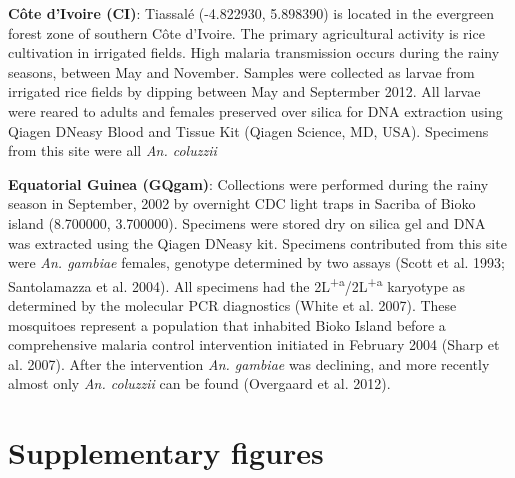 \documentclass[a4paper,11pt,abstracton,hidelinks]{scrartcl}
\newcommand{\beginsupplement}{%
  \setcounter{table}{0}
  \renewcommand{\thetable}{S\arabic{table}}%
  \setcounter{figure}{0}
  \renewcommand{\thefigure}{S\arabic{figure}}%
}
\begin{document}
%
\textbf{C\^{o}te d'Ivoire (CI)}: Tiassal\'{e} (-4.822930, 5.898390) is located in the evergreen forest zone of southern C\^{o}te d'Ivoire.
%
The primary agricultural activity is rice cultivation in irrigated fields.
%
High malaria transmission occurs during the rainy seasons, between May and November.
%
Samples were collected as larvae from irrigated rice fields by dipping between May and Septermber 2012.
%
All larvae were reared to adults and females preserved over silica for DNA extraction using Qiagen DNeasy Blood and Tissue Kit (Qiagen Science, MD, USA).
%
Specimens from this site were all \textit{An. coluzzii}

%
\textbf{Equatorial Guinea (GQgam)}: Collections were performed during the rainy season in September, 2002 by overnight CDC light traps in Sacriba of Bioko island (8.700000, 3.700000).
%
Specimens were stored dry on silica gel and DNA was extracted using the Qiagen DNeasy kit.
%
Specimens contributed from this site were \textit{An. gambiae} females, genotype determined by two assays (Scott et al. 1993; Santolamazza et al. 2004).
%
All specimens had the 2L\textsuperscript{+a}/2L\textsuperscript{+a} karyotype as determined by the molecular PCR diagnostics (White et al. 2007). 
%
These mosquitoes represent a population that inhabited Bioko Island before a comprehensive malaria control intervention initiated in February 2004 (Sharp et al. 2007). 
%
After the intervention \textit{An. gambiae} was declining, and more recently almost only \textit{An. coluzzii} can be found (Overgaard et al. 2012).

%






\beginsupplement
\section*{Supplementary figures}


\clearpage
\end{document}
